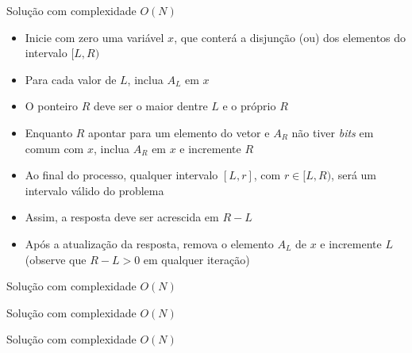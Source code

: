 \begin{frame}[fragile]{Solução com complexidade $O(N)$}

    \begin{itemize}
        \item Inicie com zero uma variável $x$, que conterá a disjunção (ou) dos elementos do
            intervalo $[L, R)$

        \item Para cada valor de $L$, inclua $A_L$ em $x$

        \item O ponteiro $R$ deve ser o maior dentre $L$ e o próprio $R$

        \item Enquanto $R$ apontar para um elemento do vetor e $A_R$ não tiver \textit{bits} em
            comum com $x$, inclua $A_R$ em $x$ e incremente $R$

        \item Ao final do processo, qualquer intervalo $[L, r]$, com $r\in [L, R)$, será um
            intervalo válido do problema

        \item Assim, a resposta deve ser acrescida em $R - L$

        \item Após a atualização da resposta, remova o elemento $A_L$ de $x$ e incremente $L$
            (observe que $R - L > 0$ em qualquer iteração)
    \end{itemize}

\end{frame}
\begin{frame}[fragile]{Solução com complexidade $O(N)$}
\end{frame}

\begin{frame}[fragile]{Solução com complexidade $O(N)$}
\end{frame}

\begin{frame}[fragile]{Solução com complexidade $O(N)$}
\end{frame}
